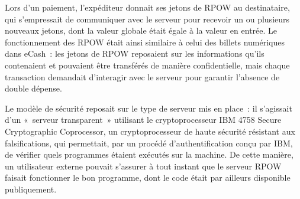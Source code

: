 Lors d'un paiement, l'expéditeur donnait ses jetons de RPOW au destinataire, qui s'empressait de communiquer avec le serveur pour recevoir un ou plusieurs nouveaux jetons, dont la valeur globale était égale à la valeur en entrée. Le fonctionnement des RPOW était ainsi similaire à celui des billets numériques dans eCash~: les jetons de RPOW reposaient sur les informations qu'ils contenaient et pouvaient être transférés de manière confidentielle, mais chaque transaction demandait d'interagir avec le serveur pour garantir l'absence de double dépense.

Le modèle de sécurité reposait sur le type de serveur mis en place~: il s'agissait d'un «~serveur transparent~» utilisant le cryptoprocesseur IBM 4758 Secure Cryptographic Coprocessor, un cryptoprocesseur de haute sécurité résistant aux falsifications, qui permettait, par un procédé d'authentification conçu par IBM, de vérifier quels programmes étaient exécutés sur la machine. De cette manière, un utilisateur externe pouvait s'assurer à tout instant que le serveur RPOW faisait fonctionner le bon programme, dont le code était par ailleurs disponible publiquement.

